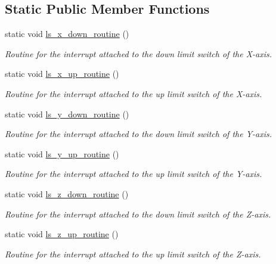 \subsection*{Static Public Member Functions}
\begin{DoxyCompactItemize}
\item 
static void \hyperlink{class_c_n_c___router_a76627728e4ee416ad2ee42dcd7e5ad39}{ls\+\_\+x\+\_\+down\+\_\+routine} ()
\begin{DoxyCompactList}\small\item\em Routine for the interrupt attached to the down limit switch of the X-\/axis. \end{DoxyCompactList}\item 
static void \hyperlink{class_c_n_c___router_aefdb4b267eaab43574728c4027b28c30}{ls\+\_\+x\+\_\+up\+\_\+routine} ()
\begin{DoxyCompactList}\small\item\em Routine for the interrupt attached to the up limit switch of the X-\/axis. \end{DoxyCompactList}\item 
static void \hyperlink{class_c_n_c___router_a86d9329960e7fd3befcf7198f4479eb6}{ls\+\_\+y\+\_\+down\+\_\+routine} ()
\begin{DoxyCompactList}\small\item\em Routine for the interrupt attached to the down limit switch of the Y-\/axis. \end{DoxyCompactList}\item 
static void \hyperlink{class_c_n_c___router_a3db0c4ccb3afee8fbd5de9feecae50b8}{ls\+\_\+y\+\_\+up\+\_\+routine} ()
\begin{DoxyCompactList}\small\item\em Routine for the interrupt attached to the up limit switch of the Y-\/axis. \end{DoxyCompactList}\item 
static void \hyperlink{class_c_n_c___router_aadcf75c5b14d0d52136335e3cdf5b84a}{ls\+\_\+z\+\_\+down\+\_\+routine} ()
\begin{DoxyCompactList}\small\item\em Routine for the interrupt attached to the down limit switch of the Z-\/axis. \end{DoxyCompactList}\item 
static void \hyperlink{class_c_n_c___router_af730eb61762ec9e173e87d73b7e6ef23}{ls\+\_\+z\+\_\+up\+\_\+routine} ()
\begin{DoxyCompactList}\small\item\em Routine for the interrupt attached to the up limit switch of the Z-\/axis. \end{DoxyCompactList}\end{DoxyCompactItemize}
